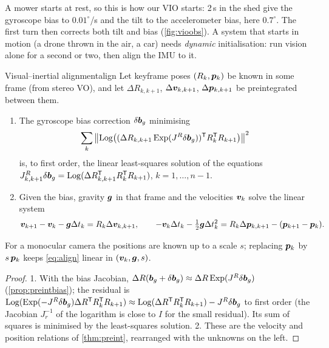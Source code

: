 A mower starts at rest, so this is how our VIO starts: 2\,s in the shed
give the gyroscope bias to $0.01^\circ$/s and the tilt to the
accelerometer bias, here $0.7^\circ$. The first turn then corrects both
tilt and bias (\cref{fig:vioobs}). A system that starts in motion (a
drone thrown in the air, a car) needs \emph{dynamic} initialisation:
run vision alone for a second or two, then align the IMU to it.

\begin{proposition}{Visual--inertial alignment}{align}
Let keyframe poses $(R_k,\bm{p}_k)$ be known in some frame (from stereo VO),
and let $\Delta R_{k,k+1}$, $\Delta\bm{v}_{k,k+1}$, $\Delta\bm{p}_{k,k+1}$
be preintegrated between them.
\begin{enumerate}[nosep]
\item The gyroscope bias correction $\delta\bm{b}_g$ minimising
  \[
  \sum_k\left\lVert \operatorname{Log}\bigl((\Delta R_{k,k+1}\operatorname{Exp}(J^R\delta\bm{b}_g))^{\mathsf{T}}
  R_k^{\mathsf{T}} R_{k+1}\bigr)\right\rVert^2
  \]
  is, to first order, the linear least-squares solution of the equations
  $J^R_{k,k+1}\delta\bm{b}_g=\operatorname{Log}(\Delta R_{k,k+1}^{\mathsf{T}} R_k^{\mathsf{T}} R_{k+1})$,
  $k=1,\dots,n-1$.
\item Given the bias, gravity $\bm{g}$ in that frame and the velocities
  $\bm{v}_k$ solve the linear system
  \begin{equation}\label{eq:align}
  \bm{v}_{k+1}-\bm{v}_k-\bm{g}\Delta t_k=R_k\Delta\bm{v}_{k,k+1},
  \qquad
  -\bm{v}_k\Delta t_k-\tfrac12\bm{g}\Delta t_k^2=R_k\Delta
  \bm{p}_{k,k+1}-(\bm{p}_{k+1}-\bm{p}_k).
  \end{equation}
\end{enumerate}
For a monocular camera the positions are known up to a scale $s$;
replacing $\bm{p}_k$ by $s\,\bm{p}_k$ keeps \eqref{eq:align} linear in
$(\bm{v}_k,\bm{g},s)$.
\end{proposition}

\begin{proof}
1. With the bias Jacobian, $\Delta R(\bm{b}_g+\delta\bm{b}_g)\approx
\Delta R\operatorname{Exp}(J^R\delta\bm{b}_g)$ (\cref{prop:preintbias}); the residual
is $\operatorname{Log}(\operatorname{Exp}(-J^R\delta\bm{b}_g)\Delta R^{\mathsf{T}} R_k^{\mathsf{T}} R_{k+1})\approx
\operatorname{Log}(\Delta R^{\mathsf{T}} R_k^{\mathsf{T}} R_{k+1})-J^R\delta\bm{b}_g$ to first order (the
Jacobian $J_r^{-1}$ of the logarithm is close to $I$ for the small
residual). Its sum of squares is minimised by the least-squares
solution. 2. These are the velocity and position relations of
\cref{thm:preint}, rearranged with the unknowns on the left.
\end{proof}

